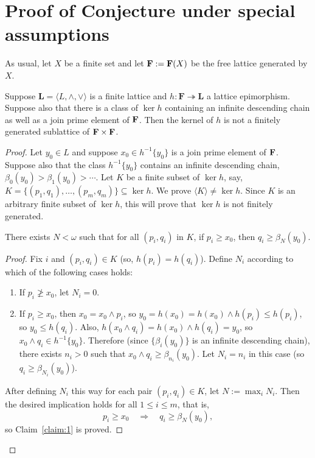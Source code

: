 \section{Proof of Conjecture under special assumptions}\label{app:conjecture}
As usual, let $X$ be a finite set and let $\mathbf{F} := \mathbf{F} (X)$ be the free 
lattice generated by $X$.
\begin{proposition}\label{prop:conjecture}
Suppose $\mathbf L = \langle L, \wedge, \vee\rangle$ is a finite lattice and 
$h\colon \mathbf{F} \twoheadrightarrow \mathbf{L}$ a lattice epimorphism.
Suppose also that there is a class of $\ker h$ containing an infinite descending 
chain as well as a join prime element of $\mathbf{F}$. 
Then the kernel of $h$ is not a finitely generated sublattice 
of $\mathbf{F} \times \mathbf{F}$.
\end{proposition}
\begin{proof} Let $y_0\in L$ and suppose 
  $x_0 \in h^{-1}\{y_0\}$ is a join prime element of $\mathbf{F}$. 
  Suppose also that the class $h^{-1}\{y_0\}$ contains an 
  infinite descending chain, $\beta_0(y_0) > \beta_1(y_0) > \cdots$.
  Let $K$ be a finite subset of $\ker h$, say, 
  $K = \{(p_1, q_1), \dots, (p_{m}, q_{m})\} \subseteq \ker h$.
  We prove $\langle K \rangle \neq \ker h$. 
  Since $K$ is an arbitrary finite subset of $\ker h$, this will prove 
  that $\ker h$ is not finitely generated.

\begin{claim}
  \label{claim:1}
There exists $N<\omega$ such that for all $(p_i, q_i)$ in $K$, if $p_i \geqslant x_0$, then $q_i \geqslant \beta_N (y_0)$.
\end{claim}
\begin{proof}
Fix $i$ and $(p_i, q_i) \in K$ (so, $h(p_i) = h(q_i)$). Define $N_i$ according 
to which of the following cases holds:
\begin{enumerate}
\item If $p_i \ngeqslant x_0$, let $N_i = 0$.  
\item If $p_i\geqslant x_0$, then $x_0 = x_0\wedge p_i$, so 
$y_0 = h(x_0) = h(x_0) \wedge h(p_i) \leqslant h(p_i)$, so $y_0\leqslant h(q_i)$. 
Also, $h(x_0 \wedge q_i) = h(x_0) \wedge h(q_i) = y_0$, so $x_0\wedge q_i \in h^{-1}\{y_0\}$. 
Therefore (since $\{\beta_i(y_0)\}$ is an infinite descending chain),
there exists $n_i>0$ such that $x_0 \wedge q_i \geqslant\beta_{n_i}(y_0)$. 
Let $N_i = n_i$ in this case (so $q_i \geqslant \beta_{N_i}(y_0)$).
\end{enumerate}
After defining $N_i$ this way for each pair $(p_i,q_i)\in K$, 
let $N := \max_i N_i$. %
Then the desired implication holds for all $1\leqslant i \leqslant m$, that is,
\begin{equation}
\label{eq:star3}    
p_i \geqslant x_0 \quad \Longrightarrow \quad q_i \geqslant \beta_N(y_0),
\end{equation}
so Claim~\ref{claim:1} is proved.
\end{proof}


\end{proof}
